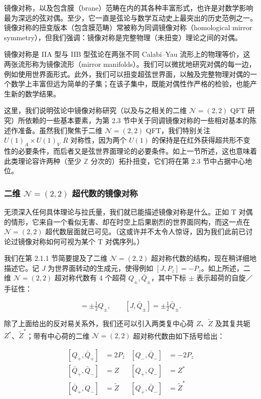 镜像对称，以及包含膜（brane）范畴在内的其各种丰富形式，也许是对数学影响最为深远的弦对偶。至少，它一直是弦论与数学互动史上最突出的历史范例之一。
镜像对称的扭变版本（包含膜范畴）常被称为同调镜像对称（homological mirror symmetry），但我们强调：镜像对称是完整物理（未扭变）理论之间的对偶。

镜像对称是 IIA 型与 IIB 型弦论在两张不同 Calabi--Yau 流形上的物理等价，这两张流形称为镜像流形（mirror manifolds）。我们可以微扰地研究对偶的每一边，例如使用世界面形式。此外，我们可以扭变超弦世界面，以触及完整物理对偶的一个数学上丰富但远为简单的子集；在该子集中，既能对偶性作严格的检验，也能产生新的数学结果。

这里，我们说明弦论中镜像对称研究（以及与之相关的二维 $\mathcal{N}=(2,2)$ QFT 研究）所依赖的一些基本要素，为第 2.3 节中关于同调镜像对称的一些相对基本的陈述作准备。虽然我们聚焦于二维 $\mathcal{N}=(2,2)$ QFT，我们特别关注 $U(1)_A\times U(1)_V$ $R$ 对称性，因为两个 $U(1)$ 的保持是在红外获得超共形不变性的必要条件，而后者又是弦世界面理论的必要条件。如上一节所述，这也意味着此类理论容许两种（至少 $\mathbb{Z}$ 分次的）拓扑扭变，它们将在第 2.3 节中占据中心地位。

\subsubsection{二维 $\mathcal{N}=(2,2)$ 超代数的镜像对称}

无须深入任何具体理论与拉氏量，我们就已能描述镜像对称是什么。正如 T 对偶的情形，它来自一个看似无害、却在时空上后果剧烈的世界面同构，而这一点在 $\mathcal{N}=(2,2)$ 超代数层面就已可见。（这或许并不太令人惊讶，因为我们此前已讨论过镜像对称如何可视为某个 T 对偶序列。）

我们在第 2.1.1 节简要提及了二维 $\mathcal{N}=(2,2)$ 超对称代数的结构，现在稍详细地描述它。记 $J$ 为世界面转动的生成元，使得例如 $[J,P_z]=-P_z$。如上所述，二维 $\mathcal{N}=(2,2)$ 超对称代数有 4 个超荷 $Q_\pm,\bar Q_\pm$，其中下标 $\pm$ 表示超荷的自旋／手征性：

\begin{equation}
[J,Q_\pm] = \pm\tfrac12 Q_\pm, \qquad [J,\bar Q_\pm] = \pm\tfrac12 \bar Q_\pm.
\tag{2.9}
\end{equation}

除了上面给出的反对易关系外，我们还可以引入两类复中心荷 $Z$、$\tilde Z$ 及其复共轭 $Z^*$、$\tilde Z^*$；带有中心荷的二维 $\mathcal{N}=(2,2)$ 超对称代数由如下括号给出：

\begin{equation}
\begin{aligned}
[Q_+,\bar Q_+] &= 2P_{\bar z} & [Q_-,\bar Q_-] &= -2P_z\\
[\bar Q_+,\bar Q_-] &= Z & [Q_+,Q_-] &= Z^*\\
[\bar Q_+,Q_-] &= \tilde Z & [Q_+,\bar Q_-] &= \tilde Z^*
\end{aligned}\tag{2.10}
\end{equation}

